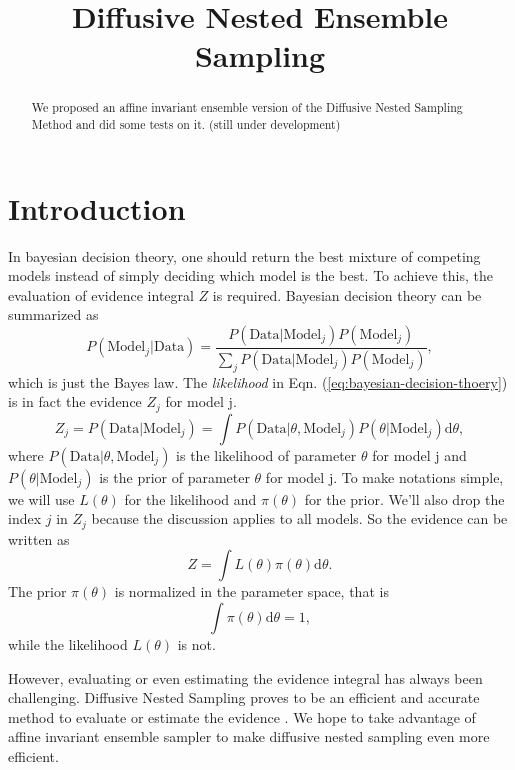 \documentclass[letterpaper, preprint]{aastex}
\begin{document}
\title{
  Diffusive Nested Ensemble Sampling
}

\begin{abstract}
We proposed an affine invariant ensemble version of the Diffusive Nested Sampling Method and did some tests on it. (still under development)

\end{abstract}


\section{Introduction}

In bayesian decision theory, one should return the best mixture of competing models instead of simply deciding which model is the best. To achieve this, the evaluation of evidence integral $Z$ is required. Bayesian decision theory can be summarized as
\begin{equation}
P(\mathrm{Model}_j|\mathrm{Data})=\frac{P(\mathrm{Data}|\mathrm{Model}_j)P(\mathrm{Model}_j)}{\sum_j{P(\mathrm{Data}|\mathrm{Model}_j)P(\mathrm{Model}_j)}},
\label{eq:bayesian-decision-thoery}
\end{equation}
which is just the Bayes law. The \textit{likelihood} in Eqn. (\ref{eq:bayesian-decision-thoery}) is in fact the evidence $Z_j$ for model j.
\begin{equation}
Z_j=P(\mathrm{Data}|\mathrm{Model}_j)=\int P(\mathrm{Data}|\theta, \mathrm{Model}_j) P(\theta|\mathrm{Model}_j)\mathrm{d}\theta,
\end{equation}
where $P(\mathrm{Data}|\theta, \mathrm{Model}_j)$ is the likelihood of parameter $\theta$ for model j and $P(\theta|\mathrm{Model}_j)$ is the prior of parameter $\theta$ for model j. To make notations simple, we will use $L(\theta)$ for the likelihood and $\pi(\theta)$ for the prior. We'll also drop the index $j$ in $Z_j$ because the discussion applies to all models. So the evidence can be written as
\begin{equation}
Z=\int\! L(\theta)\pi(\theta)\mathrm{d}\theta.
\end{equation}
The prior $\pi(\theta)$ is normalized in the parameter space, that is
\begin{equation}
\int\!\pi(\theta)\mathrm{d}\theta=1,
\end{equation}
while the likelihood $L(\theta)$ is not.

However, evaluating or even estimating the evidence integral has always been challenging. Diffusive Nested Sampling proves to be an efficient and accurate method to evaluate or estimate the evidence \citep{brewer11a}. We hope to take advantage of affine invariant ensemble sampler \citep{goodman10a} to make diffusive nested sampling even more efficient.
\end{document}

